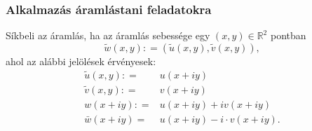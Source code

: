 \documentclass[12pt,a4paper]{scrartcl}
\begin{document}
\hypertarget{alkalmazas-aramlastani-feladatokra}{%
\subsubsection{Alkalmazás áramlástani
feladatokra}\label{alkalmazas-aramlastani-feladatokra}}

Síkbeli az áramlás, ha az áramlás sebessége egy
\(\left( {x,y} \right) \in {\mathbb{R}}^{2}\) pontban
\[ \tilde w\left( {x,y} \right): = \left( {\tilde u\left( {x,y} \right),\tilde v\left( {x,y} \right)} \right),\]
ahol az alábbi jelölések érvényesek: \[\begin{aligned}
  \tilde u\left( {x,y} \right): =  & u\left( {x + iy} \right) \\ 
  \tilde v\left( {x,y} \right): =  & v\left( {x + iy} \right) \\ 
  w\left( {x + iy} \right): =  & u\left( {x + iy} \right) + iv\left( {x + iy} \right) \\ 
  \bar w\left( {x + iy} \right) =  & u\left( {x + iy} \right) - i \cdot v\left( {x + iy} \right). \\ 
\end{aligned} \]
\end{document}
